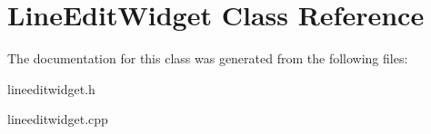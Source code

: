 \hypertarget{class_line_edit_widget}{}\section{Line\+Edit\+Widget Class Reference}
\label{class_line_edit_widget}


The documentation for this class was generated from the following files\+:\begin{DoxyCompactItemize}
\item 
lineeditwidget.\+h\item 
lineeditwidget.\+cpp\end{DoxyCompactItemize}
